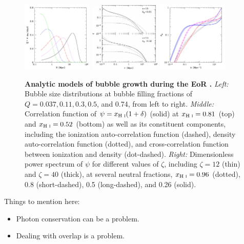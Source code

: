 \begin{figure}[]
\begin{center}
\includegraphics[width=0.3\textwidth]{Mirocha/fzh04_fig2.pdf} \includegraphics[width=0.3\textwidth]{Mirocha/fzh04_fig5.pdf} \includegraphics[width=0.3\textwidth]{Mirocha/fzh04_fig7.pdf}
\end{center}
\caption{{\bf Analytic models of bubble growth during the EoR \cite{Furlanetto2004}.} \textit{Left:} Bubble size distributions at bubble filling fractions of $Q=0.037, 0.11, 0.3, 0.5$, and 0.74, from left to right. \textit{Middle:} Correlation function of $\psi = x_{\text{H } \textsc{i}} (1 + \delta)$ (solid) at $x_{\text{H } \textsc{i}}=0.81$ (top) and $x_{\text{H } \textsc{i}} = 0.52$ (bottom) as well as its constituent components, including the ionization auto-correlation function (dashed), density auto-correlation function (dotted), and cross-correlation function between ionization and density (dot-dashed). \textit{Right:} Dimensionless power spectrum of $\psi$ for different values of $\zeta$, including $\zeta=12$ (thin) and $\zeta=40$ (thick), at several neutral fractions, $x_{\text{H } \textsc{i}}=0.96$ (dotted), 0.8 (short-dashed), 0.5 (long-dashed), and 0.26 (solid).}
\label{fig:fzh04}
\end{figure}

{\color{red} Things to mention here:
\begin{itemize}
	\item Photon conservation can be a problem.
	\item Dealing with overlap is a problem.
\end{itemize}}



